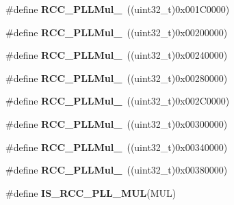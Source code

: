 \begin{DoxyCompactItemize}
\item 
\hypertarget{group__PLL__multiplication__factor_ga984bc5a117e3c6066e2fc7b29a0affda}{
\#define {\bfseries RCC\_\-PLLMul\_}~((uint32\_\-t)0x001C0000)}
\label{group__PLL__multiplication__factor_ga984bc5a117e3c6066e2fc7b29a0affda}

\item 
\hypertarget{group__PLL__multiplication__factor_ga572881d8c1e6c5b635198b286a2f4087}{
\#define {\bfseries RCC\_\-PLLMul\_}~((uint32\_\-t)0x00200000)}
\label{group__PLL__multiplication__factor_ga572881d8c1e6c5b635198b286a2f4087}

\item 
\hypertarget{group__PLL__multiplication__factor_ga15da9e109b8556e96bdb9543347366c9}{
\#define {\bfseries RCC\_\-PLLMul\_}~((uint32\_\-t)0x00240000)}
\label{group__PLL__multiplication__factor_ga15da9e109b8556e96bdb9543347366c9}

\item 
\hypertarget{group__PLL__multiplication__factor_ga5c6729e9c63b3e84d1a86a6b0f571f88}{
\#define {\bfseries RCC\_\-PLLMul\_}~((uint32\_\-t)0x00280000)}
\label{group__PLL__multiplication__factor_ga5c6729e9c63b3e84d1a86a6b0f571f88}

\item 
\hypertarget{group__PLL__multiplication__factor_ga78b3638b79c30920c09f18206daafc7a}{
\#define {\bfseries RCC\_\-PLLMul\_}~((uint32\_\-t)0x002C0000)}
\label{group__PLL__multiplication__factor_ga78b3638b79c30920c09f18206daafc7a}

\item 
\hypertarget{group__PLL__multiplication__factor_ga457e11adfe1e815eeb5f38de61a94328}{
\#define {\bfseries RCC\_\-PLLMul\_}~((uint32\_\-t)0x00300000)}
\label{group__PLL__multiplication__factor_ga457e11adfe1e815eeb5f38de61a94328}

\item 
\hypertarget{group__PLL__multiplication__factor_gaad1fbc2e251391b4c469e39ccf05d642}{
\#define {\bfseries RCC\_\-PLLMul\_}~((uint32\_\-t)0x00340000)}
\label{group__PLL__multiplication__factor_gaad1fbc2e251391b4c469e39ccf05d642}

\item 
\hypertarget{group__PLL__multiplication__factor_ga98118a80e57ed822485df8a8bef3cb1f}{
\#define {\bfseries RCC\_\-PLLMul\_}~((uint32\_\-t)0x00380000)}
\label{group__PLL__multiplication__factor_ga98118a80e57ed822485df8a8bef3cb1f}

\item 
\#define {\bfseries IS\_\-RCC\_\-PLL\_\-MUL}(MUL)
\end{DoxyCompactItemize}


